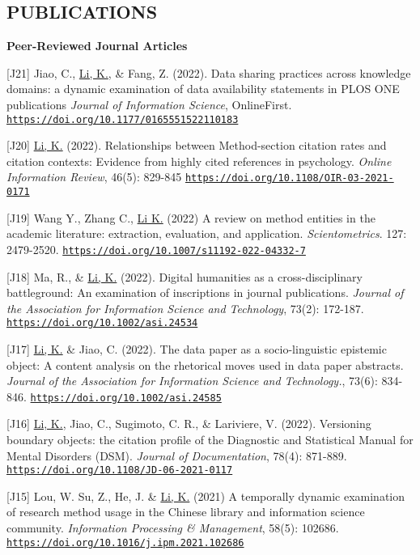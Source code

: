 \documentclass[margin, 10pt]{res} %
\begin{document}
\begin{resume}
\section{PUBLICATIONS}

\textbf{Peer-Reviewed Journal Articles}

[J21] Jiao, C., \underline{Li, K.}, \& Fang, Z. (2022). Data sharing practices across knowledge domains: a dynamic examination of data availability statements in PLOS ONE publications \textit{Journal of Information Science}, OnlineFirst. \href{https://doi.org/10.1177/0165551522110183}{\nolinkurl{https://doi.org/10.1177/0165551522110183}} 

[J20] \underline{Li, K.} (2022). Relationships between Method-section citation rates and citation contexts: Evidence from highly cited references in psychology. \textit{Online Information Review}, 46(5): 829-845 \href{https://doi.org/10.1108/OIR-03-2021-0171}{\nolinkurl{https://doi.org/10.1108/OIR-03-2021-0171}} 

[J19] Wang Y., Zhang C., \underline{Li K.} (2022) A review on method entities in the academic literature: extraction, evaluation, and application. \textit{Scientometrics}. 127: 2479-2520. \href{https://doi.org/10.1007/s11192-022-04332-7}{\nolinkurl{https://doi.org/10.1007/s11192-022-04332-7}}

[J18] Ma, R., \& \underline{Li, K.} (2022). Digital humanities as a cross-disciplinary battleground: An examination of inscriptions in journal publications. \textit{Journal of the Association for Information Science and Technology}, 73(2): 172-187. \href{https://doi.org/10.1002/asi.24534}{\nolinkurl{https://doi.org/10.1002/asi.24534}}

[J17] \underline{Li, K.} \& Jiao, C. (2022). The data paper as a socio-linguistic epistemic object: A content analysis on the rhetorical moves used in data paper abstracts. \textit{Journal of the Association for Information Science and Technology.}, 73(6): 834-846. \href{https://doi.org/10.1002/asi.24585}{\nolinkurl{https://doi.org/10.1002/asi.24585}}

[J16] \underline{Li, K.}, Jiao, C., Sugimoto, C. R., \& Lariviere, V. (2022). Versioning boundary objects: the citation profile of the Diagnostic and Statistical Manual for Mental Disorders (DSM). \textit{Journal of Documentation}, 78(4): 871-889. \href{https://doi.org/10.1108/JD-06-2021-0117}{\nolinkurl{https://doi.org/10.1108/JD-06-2021-0117}}

[J15] Lou, W. Su, Z., He, J. \& \underline{Li, K.} (2021) A temporally dynamic examination of research method usage in the Chinese library and information science community. \textit{Information Processing \& Management}, 58(5): 102686. \href{https://doi.org/10.1016/j.ipm.2021.102686}{\nolinkurl{https://doi.org/10.1016/j.ipm.2021.102686}} 


\end{resume}
\end{document}
